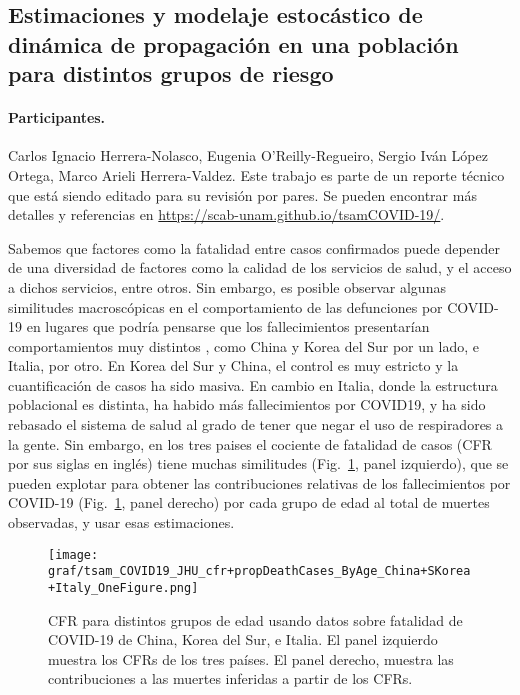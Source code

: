 
\subsection*{Estimaciones y modelaje estocástico de dinámica de propagación en una población para distintos grupos de riesgo}

\paragraph{Participantes.} Carlos Ignacio Herrera-Nolasco, Eugenia O'Reilly-Regueiro, Sergio Iván López Ortega, Marco Arieli Herrera-Valdez. Este trabajo es parte de un reporte técnico que está siendo editado para su revisión por pares. Se pueden encontrar más detalles y referencias en \url{https://scab-unam.github.io/tsamCOVID-19/}.  

\bigskip
Sabemos que factores como la fatalidad entre casos confirmados puede depender de una diversidad de factores como la calidad de los servicios de salud, y el acceso a dichos servicios, entre otros. 
Sin embargo, es posible observar algunas similitudes macroscópicas en el comportamiento de las defunciones por COVID-19 en lugares que podría pensarse que los fallecimientos presentarían comportamientos muy distintos , como China y Korea del Sur por un lado, e Italia, por otro. 
En Korea del Sur y China, el control es muy estricto y la cuantificación de casos ha sido masiva. 
En cambio en Italia, donde la estructura poblacional es distinta, ha habido más fallecimientos por COVID19, y ha sido rebasado el sistema de salud al grado de tener que negar el uso de respiradores a la gente. 
Sin embargo, en los tres paises el cociente de fatalidad de casos (CFR por sus siglas en inglés) tiene muchas similitudes (Fig.~\ref{cfrPDEdadChinaKSItalia}, panel izquierdo), que se pueden explotar para obtener las contribuciones relativas de los fallecimientos por COVID-19 (Fig.~\ref{cfrPDEdadChinaKSItalia}, panel derecho) por cada grupo de edad al total de muertes observadas, y usar esas estimaciones. 

\begin{figure}[h]
\caption{CFR para distintos grupos de edad usando datos sobre fatalidad de COVID-19 de China, Korea del Sur, e Italia. El panel izquierdo muestra los CFRs de los tres países. El panel derecho, muestra las contribuciones a las muertes inferidas a partir de los CFRs. } \label{cfrPDEdadChinaKSItalia}
\begin{center}
    \texttt{[image: graf/tsam\_COVID19\_JHU\_cfr+propDeathCases\_ByAge\_China+SKorea+Italy\_OneFigure.png]}
    \end{center}
\end{figure}

